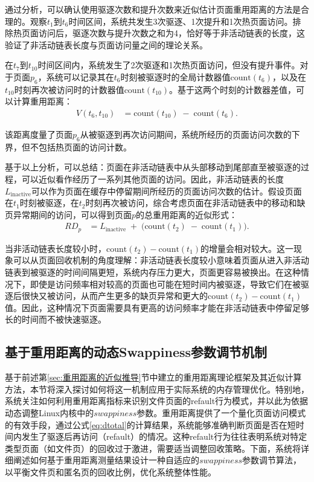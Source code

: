 通过分析，可以确认使用驱逐次数和提升次数来近似估计页面重用距离的方法是合理的。观察$t_1$到$t_6$时间区间，系统共发生3次驱逐、1次提升和1次热页面访问。排除热页面访问后，驱逐次数与提升次数之和为4，恰好等于非活动链表的长度，这验证了非活动链表长度与页面访问量之间的理论关系。

在$t_7$到$t_{10}$时间区间内，系统发生了2次驱逐和1次热页面访问，但没有提升事件。对于页面$p_6$，系统可以记录其在$t_6$时刻被驱逐时的全局计数器值$\mathrm{count}(t_6)$，以及在$t_{10}$时刻再次被访问时的计数器值$\mathrm{count}(t_{10})$。基于这两个时刻的计数器差值，可以计算重用距离：
\begin{align}
  \label{eq:refault_distance}
  V(t_6, t_{10})
  &= 
  \mathrm{count}(t_{10})
  \;-\;
  \mathrm{count}(t_6).
\end{align}

该距离度量了页面$p_6$从被驱逐到再次访问期间，系统所经历的页面访问次数的下界，但不包括热页面的访问计数。

基于以上分析，可以总结：页面在非活动链表中从头部移动到尾部直至被驱逐的过程，可以近似看作经历了一系列其他页面的访问。因此，非活动链表的长度$L_{\mathrm{inactive}}$可以作为页面在缓存中停留期间所经历的页面访问次数的估计。假设页面在$t_1$时刻被驱逐，在$t_2$时刻再次被访问，综合考虑页面在非活动链表中的移动和缺页异常期间的访问，可以得到页面$p$的总重用距离的近似形式：
\begin{align}
  \label{eq:dtotal}
  RD_p
  &= 
  L_{\mathrm{inactive}}
  \;+\;
  \bigl(\mathrm{count}(t_2) \;-\; \mathrm{count}(t_1)\bigr).
\end{align}

当非活动链表长度较小时，$\mathrm{count}(t_2) - \mathrm{count}(t_1)$的增量会相对较大。这一现象可以从页面回收机制的角度理解：非活动链表长度较小意味着页面从进入非活动链表到被驱逐的时间间隔更短，系统内存压力更大，页面更容易被换出。在这种情况下，即使是访问频率相对较高的页面也可能在短时间内被驱逐，导致它们在被驱逐后很快又被访问，从而产生更多的缺页异常和更大的$\mathrm{count}(t_2) - \mathrm{count}(t_1)$值。因此，这种情况下页面需要具有更高的访问频率才能在非活动链表中停留足够长的时间而不被快速驱逐。


\subsection{基于重用距离的动态Swappiness参数调节机制}

基于前述第\ref{sec:重用距离的近似推导}节中建立的重用距离理论框架及其近似计算方法，本节将深入探讨如何将这一机制应用于实际系统的内存管理优化。特别地，系统关注如何利用重用距离指标来识别文件页面的refault行为模式，并以此为依据动态调整Linux内核中的\(swappiness\)参数。重用距离提供了一个量化页面访问模式的有效手段，通过公式\ref{eq:dtotal}的计算结果，系统能够准确判断页面是否在短时间内发生了驱逐后再访问（refault）的情况。这种refault行为往往表明系统对特定类型页面（如文件页）的回收过于激进，需要适当调整回收策略。下面，系统将详细阐述如何基于重用距离测量结果设计一种自适应的\(swappiness\)参数调节算法，以平衡文件页和匿名页的回收比例，优化系统整体性能。

